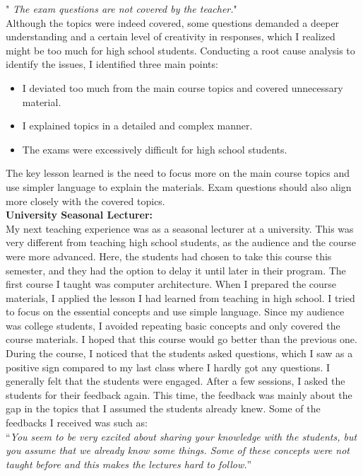" \emph { The exam questions are not covered by the teacher.}"\\

Although the topics were indeed covered, some questions demanded a deeper understanding and a certain level of creativity in responses, which I realized might be too much for high school students.
Conducting a root cause analysis to identify the issues, I identified three main points:
\begin{itemize}
 \item   I deviated too much from the main course topics and covered unnecessary material.
  \item    I explained topics in a detailed and complex manner.
  \item    The exams were excessively difficult for high school students.
\end{itemize}
The key lesson learned is the need to focus more on the main course topics and use simpler language to explain the materials. Exam questions should also align more closely with the covered topics.\\
{\bf University Seasonal Lecturer:}\\ 

My next teaching experience was as a seasonal lecturer at a university. This was very different from teaching high school students, as the audience and the course were more advanced. Here, the students had chosen to take this course this semester, and they had the option to delay it until later in their program. The first course I taught was computer architecture. When I prepared the course materials, I applied the lesson I had learned from teaching in high school. I tried to focus on the essential concepts and use simple language. Since my audience was college students, I avoided repeating basic concepts and only covered the course materials. I hoped that this course would go better than the previous one. During the course, I noticed that the students asked questions, which I saw as a positive sign compared to my last class where I hardly got any questions. I generally felt that the students were engaged. After a few sessions, I asked the students for their feedback again. This time, the feedback was mainly about the gap in the topics that I assumed the students already knew.    Some of the feedbacks I received was such as:\\

“\emph {You seem to be very excited about sharing your knowledge with the students, but you assume that we already know some things. Some of these concepts were not taught before and this makes the lectures hard to follow.}”\\

